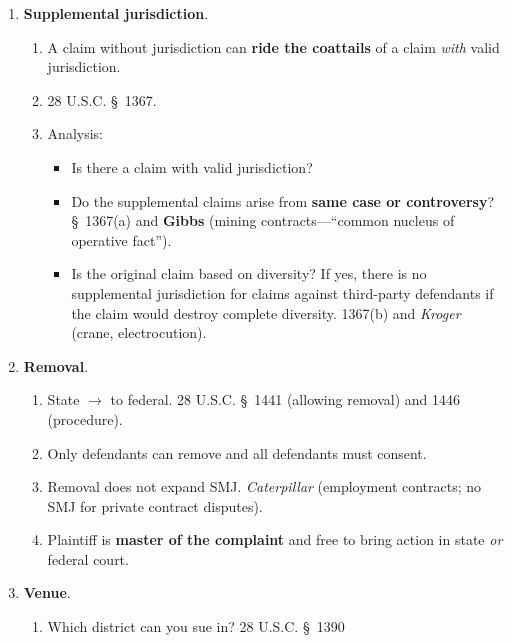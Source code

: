 \begin{enumerate}
\begin{enumerate}
\begin{enumerate}
            \item \textbf{Supplemental jurisdiction}.
            \begin{enumerate}
                \item A claim without jurisdiction can \textbf{ride the 
                coattails} of a claim \emph{with} valid jurisdiction.
                \item 28 U.S.C. \S\ 1367.
                \item Analysis:
                \begin{itemize}
                    \item Is there a claim with valid jurisdiction?
                    \item Do the supplemental claims arise from \textbf{same 
                    case or controversy}? \S\ 1367(a) and \textbf{Gibbs} 
                    (mining contracts---``common nucleus of operative fact'').
                    \item Is the original claim based on diversity? If yes, 
                    there is no supplemental jurisdiction for claims against 
                    third-party defendants if the claim would destroy complete 
                    diversity. 1367(b) and \emph{Kroger} (crane, 
                    electrocution).
                \end{itemize}
            \end{enumerate}
            \item \textbf{Removal}.
            \begin{enumerate}
                \item State $\rightarrow$ to federal. 28 U.S.C. \S\ 1441 
                (allowing removal) and 1446 (procedure).
                \item Only defendants can remove and all defendants must 
                consent.
                \item Removal does not expand SMJ. \emph{Caterpillar} 
                (employment contracts; no SMJ for private contract disputes).
                \item Plaintiff is \textbf{master of the complaint} and free 
                to bring action in state \emph{or} federal court.
            \end{enumerate}
            \item \textbf{Venue}.
            \begin{enumerate}
                \item Which district can you sue in? 28 U.S.C. \S\ 1390 

\end{enumerate}
\end{enumerate}
\end{enumerate}
\end{enumerate}
